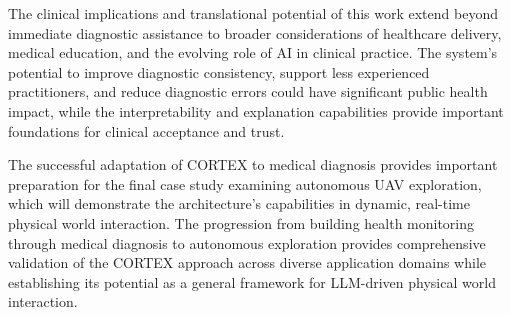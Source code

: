 The clinical implications and translational potential of this work extend beyond immediate diagnostic assistance to broader considerations of healthcare delivery, medical education, and the evolving role of AI in clinical practice. The system's potential to improve diagnostic consistency, support less experienced practitioners, and reduce diagnostic errors could have significant public health impact, while the interpretability and explanation capabilities provide important foundations for clinical acceptance and trust.

The successful adaptation of CORTEX to medical diagnosis provides important preparation for the final case study examining autonomous UAV exploration, which will demonstrate the architecture's capabilities in dynamic, real-time physical world interaction. The progression from building health monitoring through medical diagnosis to autonomous exploration provides comprehensive validation of the CORTEX approach across diverse application domains while establishing its potential as a general framework for LLM-driven physical world interaction.